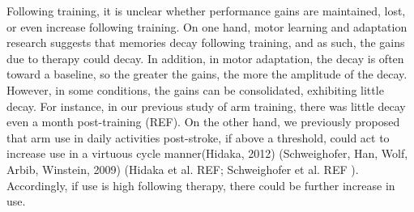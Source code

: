 Following training, it is unclear whether performance gains are maintained, lost, or even increase following training.
On one hand, motor learning and adaptation research suggests that memories decay following training, and as such, the gains due to therapy could decay. 
In addition, in motor adaptation, the decay is often toward a baseline, so the greater the gains, the more the amplitude of the decay. 
However, in some conditions, the gains can be consolidated, exhibiting little decay. 
For instance, in our previous study of arm training, there was little decay even a month post-training (REF). 
On the other hand, we previously proposed that arm use in daily activities post-stroke, if above a threshold, could act to increase use in a virtuous cycle manner(Hidaka, 2012) (Schweighofer, Han, Wolf, Arbib,  Winstein, 2009) (Hidaka et al. REF; Schweighofer et al. REF ). 
Accordingly, if use is high following therapy, there could be further increase in use. 

